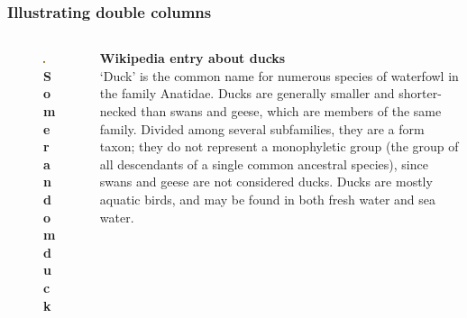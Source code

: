 \documentclass[aspectratio=169]{beamer} %
\begin{document}
\begin{frame}[t]
	\frametitle{Illustrating double columns}
	\begin{columns}
		\begin{column}{0.5\textwidth}
			\begin{figure}[htpb]
				\centering
				\includegraphics[width=0.8\linewidth]{duck_a.jpeg}
				\caption{{\bf Some random duck}}%
			\end{figure}
		\end{column}
		\begin{column}{0.5\textwidth}
			{\bf Wikipedia entry about ducks} \\
			`Duck' is the common name for numerous species of
			waterfowl in the family Anatidae. Ducks are generally
			smaller and shorter-necked than swans and geese, which
			are members of the same family. Divided among several
			subfamilies, they are a form taxon; they do not
			represent a monophyletic group (the group of all
			descendants of a single common ancestral species),
			since swans and geese are not considered ducks. Ducks
			are mostly aquatic birds, and may be found in both
			fresh water and sea water.
		\end{column} 
	\end{columns} 
\end{frame}
\end{document}
